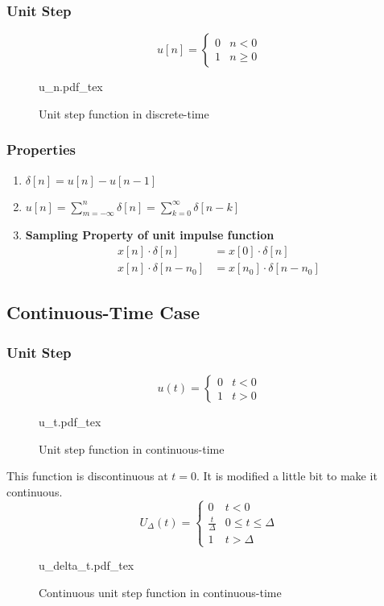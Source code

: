 \documentclass[oneside]{book}
\newcommand{\incfig}[1]{%
    {#1.pdf_tex}
}
\begin{document}
\subsubsection{Unit Step}
\[
  u[n] = \begin{cases}
    0 & n < 0    \\
    1 & n \geq 0
  \end{cases}
\]
\begin{figure}[ht]
  \centering
  \incfig{u_n}
  \caption{Unit step function in discrete-time}
\end{figure}
\subsubsection{Properties}
\begin{enumerate}
  \item \(\delta[n] = u[n] - u[n-1]\)
  \item \(u[n] = \sum\limits_{m = -\infty}^{n}\delta[n] = \sum\limits_{k = 0}^{\infty}\delta[n-k]\)
  \item \textbf{Sampling Property of unit impulse function}
        \begin{align*}
          x[n]\cdot\delta[n]     & = x[0]\cdot\delta[n]         \\
          x[n]\cdot\delta[n-n_0] & = x[n_0]\cdot\delta[n - n_0]
        \end{align*}
\end{enumerate}
\subsection{Continuous-Time Case}
\subsubsection{Unit Step}
\[
  u(t) = \begin{cases}
    0 & t < 0 \\
    1 & t > 0
  \end{cases}
\]
\begin{figure}[ht]
  \centering
  \incfig{u_t}
  \caption{Unit step function in continuous-time}
\end{figure}
This function is discontinuous at $t = 0$. It is modified a little bit to make it continuous.
\[
  U_\Delta(t) = \begin{cases}
    0                & t<0                 \\
    \frac{t}{\Delta} & 0\leq t \leq \Delta \\
    1                & t > \Delta
  \end{cases}
\]
\begin{figure}[ht]
  \centering
  \incfig{u_delta_t}
  \caption{Continuous unit step function in continuous-time}
\end{figure}
\end{document}
